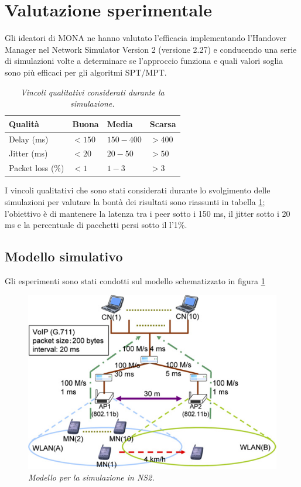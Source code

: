 \documentclass[12pt,a4paper,openright,twoside]{book}
\begin{document}
\section{Valutazione sperimentale}

Gli ideatori di MONA ne hanno valutato l'efficacia implementando
l'Handover Manager nel Network Simulator Version 2 \cite{bib:ns-2}
(versione 2.27) e conducendo una serie di simulazioni volte a
determinare se l'approccio funziona e quali valori soglia sono più
efficaci per gli algoritmi SPT/MPT.

\begin{table}
  \centering
  \begin{tabular}[bt]{|llll|}
    \hline
    Qualità & Buona & Media & Scarsa         \\
    \hline
    Delay (ms) & $<150$ & $150-400$ & $>400$ \\
    Jitter (ms) & $<20$ & $20-50$ & $>50$    \\
    Packet loss (\%) & $<1$ & $1-3$ & $>3$   \\
    \hline
  \end{tabular}
  \caption{\em Vincoli qualitativi considerati durante la simulazione.}
  \label{tab:mona:vincoli}
\end{table}

I vincoli qualitativi che sono stati considerati durante lo
svolgimento delle simulazioni per valutare la bontà dei risultati sono
riassunti in tabella \ref{tab:mona:vincoli}; l'obiettivo è di
mantenere la latenza tra i peer sotto i 150 ms, il jitter sotto i 20
ms e la percentuale di pacchetti persi sotto il l'1\%.

\subsection{Modello simulativo}

Gli esperimenti sono stati condotti sul modello schematizzato in
figura \ref{fig:mona:qos-sim-model}

\begin{figure}
  \centering
  \includegraphics[width=12cm]{img/mona-qos-sim-model}
  \caption{\em Modello per la simulazione in NS2.}
  \label{fig:mona:qos-sim-model}
\end{figure}
\end{document}
